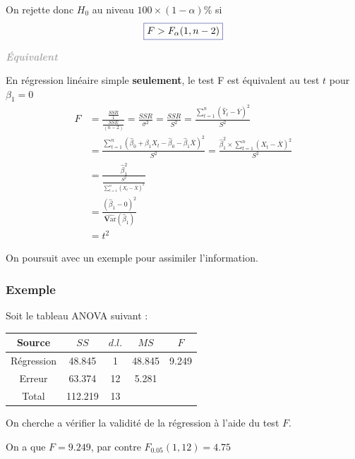 \documentclass[11pt,french]{report}
\newcommand{\Var}{\mathrm{\textbf{V}ar}}
\newenvironment{moreInfo}[1]
	{\begin{mdframed}
	\textcolor{darkgray}{\huge \raisebox{-3.5pt}{\faInfo} 
	\hspace{0.5cm} \large\bfseries #1}\\[5pt]
	\normalsize
	\makebox[0.1\textwidth][l]{}	
	\begin{minipage}{10cm}}
	{	\end{minipage}
	\end{mdframed}}
\begin{document}
On rejette donc $H_0$ au niveau $100 \times (1 - \alpha) \%$ si
\begin{equation}
\label{eq:fisher}
\color{Blue}
\boxed{\color{black}
F > F_{\alpha}(1, n-2)}
\end{equation}

\begin{moreInfo}{\color{Gray}\emph{Équivalent}
     \color{black}}
\label{equivalent}
	En régression linéaire simple \textbf{seulement}, le test F est équivalent au test $t$ pour $\beta_1 = 0$
	\begin{align*}
	F &= \frac{\frac{SSR}{1}}{\frac{SSE}{(n-2)}} = \frac{SSR}{\sigma^2} = \frac{SSR}{S^2} = \frac{\displaystyle\sum_{t=1}^n (\hat{Y}_t - \overline{Y})^2}{S^2} \\
	&= \frac{\displaystyle\sum_{t=1}^n(\hat{\beta}_0 + \hat{\beta}_1X_t - \hat{\beta}_0 - \hat{\beta}_1\overline{X})^2}{S^2} = \frac{\hat{\beta}_1^2 \times \displaystyle\sum_{t=1}^n(X_t - \overline{X})^2}{S^2} \\
	&= \frac{\hat{\beta}_1^2}{\frac{S^2}{\displaystyle\sum_{t=1}^n(X_t - \overline{X})^2}} \\
	&= \frac{(\hat{\beta}_1 - 0)^2}{\widehat{\Var}(\hat{\beta}_1)} \\
	&= t^2
	\end{align*}
\end{moreInfo}

\bigskip
On poursuit avec un exemple pour assimiler l'information.

\subsubsection*{Exemple}
Soit le tableau ANOVA suivant :
\begin{center}
\begin{tabular}{|c|c|c|c|c|}
\hline
\rowcolor{backcolour}
Source & $SS$ & $d.l.$ & $MS$ & $F$ \\
\hline
Régression & 48.845 & 1 & 48.845 & 9.249 \\
Erreur & 63.374 & 12 & 5.281 & \\
\hline
Total & 112.219 & 13 & & \\
\hline
\end{tabular}
\end{center}
On cherche a vérifier la validité de la régression à l'aide du test $F$. \newline

On a que $F = 9.249$, par contre $F_{0.05}(1, 12) = 4.75$ \newline
\end{document}
